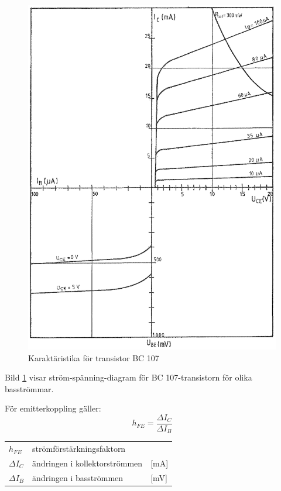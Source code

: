 \begin{figure}
\includegraphics[width=\textwidth]{images/cropped_pdfs/bild_2_2-19.pdf}
\caption{Karaktäristika för transistor BC 107}
\label{fig:BildII2-19}
\end{figure}

Bild \ref{fig:BildII2-19} visar ström-spänning-diagram för BC 107-transistorn för olika basströmmar.

För emitterkoppling gäller:
\[ h_{FE} = \frac{\Delta I_C}{\Delta I_B} \]

\begin{tabular}{lll}
	\(h_{FE}\)     & strömförstärkningsfaktorn     &  \\
	\(\Delta I_C\) & ändringen i kollektorströmmen & [mA] \\
	\(\Delta I_B\) & ändringen i basströmmen       & [mV]
\end{tabular}

